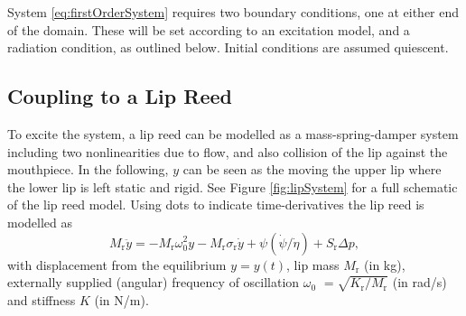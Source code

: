 System \eqref{eq:firstOrderSystem} requires two boundary conditions, one at either end of the domain. These will be set according to an excitation model, and a radiation condition, as outlined below. Initial conditions are assumed quiescent.

\subsection{Coupling to a Lip Reed}
To excite the system, a lip reed can be modelled as a mass-spring-damper system including two nonlinearities due to flow, and also collision of the lip against the mouthpiece. In the following, $y$ can be seen as the moving the upper lip where the lower lip is left static and rigid. See Figure \ref{fig:lipSystem} for a full schematic of the lip reed model. Using dots to indicate time-derivatives the lip reed is modelled as
\begin{equation}\label{eq:lipReedCont}
    M_\text{r}\ddot y = -M_\text{r}\omega_0^2 y - M_\text{r} \sigma_\text{r} \dot y +\psi(\dot \psi/
\dot \eta)+ S_\text{r}\Delta p,
\end{equation}
with displacement from the equilibrium $y = y(t)$, lip mass $M_\text{r}$ (in kg), externally supplied (angular) frequency of oscillation $\omega_0$ \SWcomment[$= \omega_0(t)$] $= \sqrt{K_\text{r}/M_\text{r}}$ (in rad/s) and stiffness $K$ \SWcomment[$= K(t)$] (in N/m).

